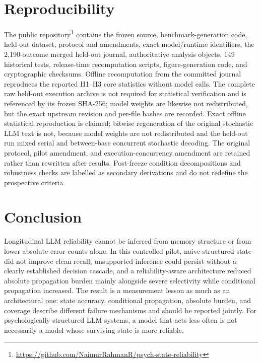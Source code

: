 \documentclass[10pt]{article}
\begin{document}
\section{Reproducibility}
The public repository\footnote{\url{https://github.com/NaimurRahmanR/psych-state-reliability}} contains the frozen source, benchmark-generation code, held-out dataset, protocol and amendments, exact model/runtime identifiers, the 2,190-outcome merged held-out journal, authoritative analysis objects, 149 historical tests, release-time recomputation scripts, figure-generation code, and cryptographic checksums. Offline recomputation from the committed journal reproduces the reported H1--H3 core statistics without model calls. The complete raw held-out execution archive is not required for statistical verification and is referenced by its frozen SHA-256; model weights are likewise not redistributed, but the exact upstream revision and per-file hashes are recorded. Exact offline statistical reproduction is claimed; bitwise regeneration of the original stochastic LLM text is not, because model weights are not redistributed and the held-out run mixed serial and between-base concurrent stochastic decoding. The original protocol, pilot amendment, and execution-concurrency amendment are retained rather than rewritten after results. Post-freeze condition decompositions and robustness checks are labelled as secondary derivations and do not redefine the prospective criteria.

\section{Conclusion}
Longitudinal LLM reliability cannot be inferred from memory structure or from lower absolute error counts alone. In this controlled pilot, naive structured state did not improve clean recall, unsupported inference could persist without a clearly established decision cascade, and a reliability-aware architecture reduced absolute propagation burden mainly alongside severe selectivity while conditional propagation increased. The result is a measurement lesson as much as an architectural one: state accuracy, conditional propagation, absolute burden, and coverage describe different failure mechanisms and should be reported jointly. For psychologically structured LLM systems, a model that acts less often is not necessarily a model whose surviving state is more reliable.



\end{document}
